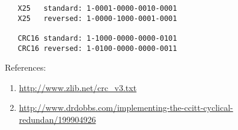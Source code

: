 \begin{verbatim}
   X25   standard: 1-0001-0000-0010-0001
   X25   reversed: 1-0000-1000-0001-0001

   CRC16 standard: 1-1000-0000-0000-0101
   CRC16 reversed: 1-0100-0000-0000-0011
\end{verbatim}


References:
\begin{enumerate}
  \item \url{http://www.zlib.net/crc_v3.txt}
  \item
  \url{http://www.drdobbs.com/implementing-the-ccitt-cyclical-redundan/199904926}
\end{enumerate}
